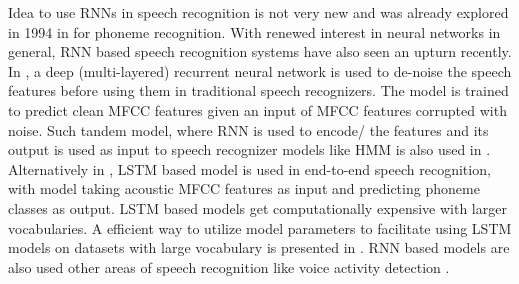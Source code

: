 \documentclass{article}
\begin{document}
Idea to use RNNs in speech recognition is not very new and was already explored in 1994 in \cite{Robinson94Rnn} for phoneme recognition. With renewed interest in neural networks in general, RNN based speech recognition systems have also seen an upturn recently. In \cite{maas2012recurrent}, a deep (multi-layered) recurrent neural network is used to de-noise the speech features before using them in traditional speech recognizers. The model is trained to predict clean MFCC features given an input of MFCC features corrupted with noise. Such tandem model, where RNN is used to encode/ the features and its output is used as input to speech recognizer models like HMM is also used in \cite{Oriol2012Revisit}. Alternatively in \cite{Alex2013}, LSTM based model is used in \cite{Alex2013} end-to-end speech recognition, with model taking acoustic MFCC features as input and predicting phoneme classes as output. LSTM based models get computationally expensive with larger vocabularies. A efficient way to utilize model parameters to facilitate using LSTM models on datasets with large vocabulary is presented in \cite{Hasim14LargeVocab}. RNN based models are also used other areas of speech recognition like voice activity detection \cite{VoiceAct2013}.





\end{document}
